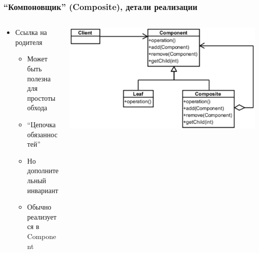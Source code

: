 \documentclass[xetex,mathserif,serif]{beamer}
\begin{document}
	\begin{frame}
		\frametitle{``Компоновщик'' (Composite), детали реализации}
		\begin{columns}
			\begin{column}{0.6\textwidth}
				\begin{itemize}
					\item Ссылка на родителя
					\begin{itemize}
						\item Может быть полезна для простоты обхода
						\item ``Цепочка обязанностей''
						\item Но дополнительный инвариант
						\item Обычно реализуется в Component
					\end{itemize}
				\end{itemize}
			\end{column}
			\begin{column}{0.4\textwidth}
				\begin{center}
					\includegraphics[width=\textwidth]{composite.png}
				\end{center}
			\end{column}
		\end{columns}


\end{frame}
\end{document}
